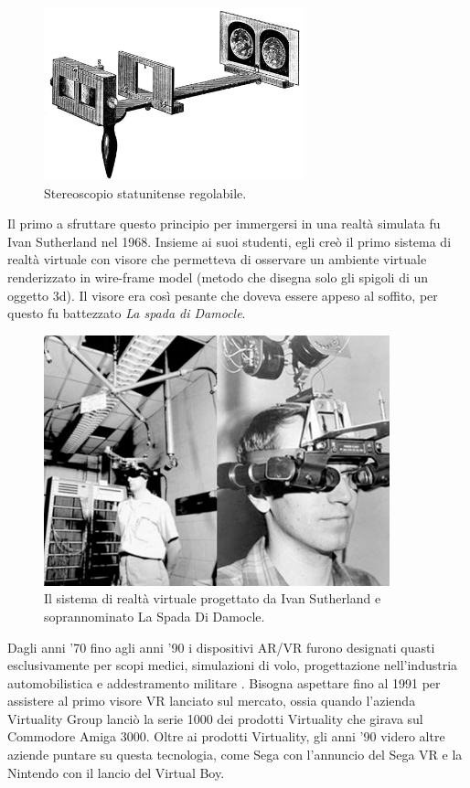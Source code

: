         \begin{figure}[!ht]
            \centering
            \includegraphics[height=5cm]{figure/Stereoscopia.jpg}
            \caption{Stereoscopio statunitense regolabile.}
        \end{figure}

        Il primo a sfruttare questo principio per immergersi in una realtà simulata fu Ivan Sutherland nel 1968.
        Insieme ai suoi studenti, egli creò il primo sistema di realtà virtuale con visore che permetteva di osservare un ambiente virtuale renderizzato in wire-frame model (metodo che disegna solo gli spigoli di un oggetto 3d).
        Il visore era così pesante che doveva essere appeso al soffito, per questo fu battezzato \textit{La spada di Damocle}.

        \begin{figure}[!ht]
            \centering
            \includegraphics[width=10cm]{figure/LaSpadaDiuDamocle.jpg}
            \caption{Il sistema di realtà virtuale progettato da Ivan Sutherland e soprannominato La Spada Di Damocle.}
        \end{figure}

        Dagli anni '70 fino agli anni '90 i dispositivi AR/VR furono designati quasti esclusivamente per scopi medici, simulazioni di volo, progettazione nell'industria automobilistica e addestramento militare \cite{70and90VR}.
        Bisogna aspettare fino al 1991 per assistere al primo visore VR lanciato sul mercato, ossia quando l'azienda Virtuality Group lanciò la serie 1000 dei prodotti Virtuality che girava sul Commodore Amiga 3000.
        Oltre ai prodotti Virtuality, gli anni '90 videro altre aziende puntare su questa tecnologia, come Sega con l'annuncio del Sega VR e la Nintendo con il lancio del Virtual Boy.

